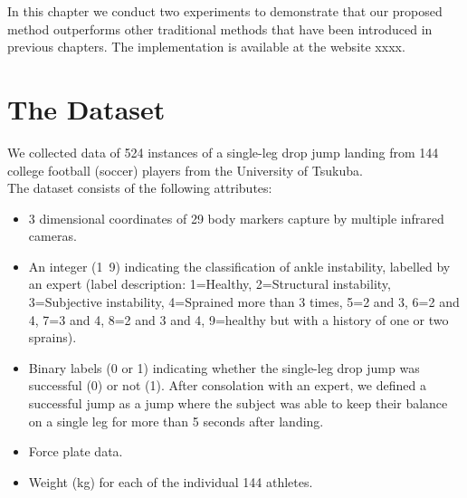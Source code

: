 In this chapter we conduct two experiments to demonstrate that our proposed method outperforms other traditional methods that have been introduced in previous chapters. The implementation is available at the website xxxx. 

\section{The Dataset}

We collected data of 524 instances of a single-leg drop jump landing from 144 college football (soccer) players from the University of Tsukuba.
\\

The dataset consists of the following attributes:
\begin{itemize}
  \item 3 dimensional coordinates of 29 body markers capture by multiple infrared cameras. 
  \item An integer (1~9) indicating the classification of ankle instability, labelled by an expert (label description: 1=Healthy, 2=Structural instability, 3=Subjective instability, 4=Sprained more than 3 times, 5=2 and 3, 6=2 and 4, 7=3 and 4, 8=2 and 3 and 4, 9=healthy but with a history of one or two sprains).
  \item Binary labels (0 or 1) indicating whether the single-leg drop jump was successful (0) or not (1). After consolation with an expert, we defined a successful jump as a jump where the subject was able to keep their balance on a single leg for more than 5 seconds after landing.
  \item Force plate data.
  \item Weight (kg) for each of the individual 144 athletes.

\end{itemize}




